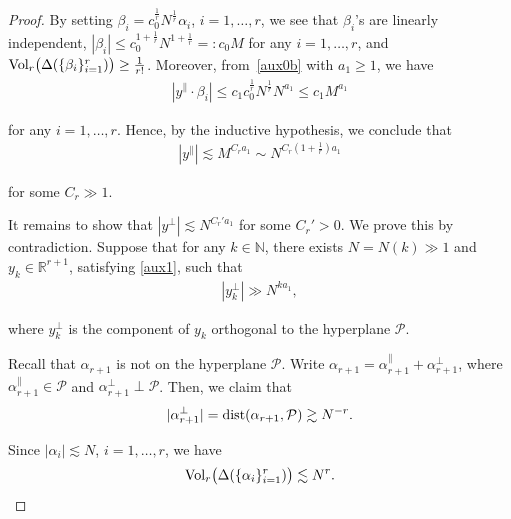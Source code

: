 \documentclass[%
11pt,  reqno]{amsart}
\newcommand{\1}{\hspace{0.2mm}\text{I}\hspace{0.2mm}}
\newcommand{\noi}{\noindent}
\newcommand{\R}{\mathbb{R}}
\newcommand{\al}{\alpha}
\newcommand{\be}{\beta}
\newcommand{\Dl}{\Delta}
\newcommand{\les}{\lesssim}
\newcommand{\ges}{\gtrsim}
\newcommand{\N}{\mathbb{N}}
\numberwithin{equation}{section}
\numberwithin{theorem}{section}
\begin{document}
\begin{proof}
\noi
By setting $\be_i = c_0^\frac 1r N^{\frac 1r} \al_i$, $i = 1, \dots, r$,
we see that $\be_i$'s are linearly independent,  
$|\be_i| \le c_0^{1 + \frac 1r} N^{1 + \frac 1r} =: c_0M$
for any 
$i = 1, \dots, r$,   and 
$\textup{Vol}_r
\big(\Dl(\{\be_i\}_{i = 1}^r)\big) \ge \frac1{r!}$.
Moreover, from~\eqref{aux0b} with $a_1 \ge 1$, we have 
\begin{align*}
|y^\parallel \cdot \be_i| \le c_1 c_0^\frac 1 r  N^\frac 1r N^{a_1}
\le c_1 M^{a_1}
\end{align*}

\noi
for any $i = 1, \dots, r$.
Hence, by the inductive hypothesis, we conclude that 
\begin{align}
|y^\parallel| \les M^{C_r a_1} \sim N^{C_r(1+ \frac 1r) a_1}
\label{YY2}
\end{align} 

\noi
for some $C_r \gg 1$.



It remains  to show that $|y^\perp| \les N^{C_r' a_1}$ for some $C_r' > 0$.
We prove this by contradiction.
Suppose that for any $k \in \N$, 
there exists $N = N(k) \gg1$ and $y_k\in \R^{r+1}$, satisfying
\eqref{aux1},  such that
\begin{align}
|y_k^\perp| \gg N^{ka_1},
\label{YY3} 
\end{align}

\noi
 where $y_k^\perp$ is the component of $y_k$ orthogonal to the hyperplane $\mathcal P$.





Recall that  $\al_{r+1}$ is not on the hyperplane $\mathcal P$.
Write $\al_{r+1} = \al_{r+1}^\parallel + \al_{r+1}^\perp$, 
where 
$\al_{r+1}^\parallel \in \mathcal P$ and $\al_{r+1}^\perp\perp \mathcal P$.
Then, 
 we claim that
\begin{align}\label{dist}
|\al_{r+1}^\perp| = {\rm dist} (\al_{r+1}, \mathcal P) \ges N^{-r}.
\end{align}

\noi
Since $ |\al_i| \les  N$, $i = 1, \dots, r$, 
we have 
\begin{align}
\textup{Vol}_r\big(\Dl(\{\al_i\}_{i = 1}^r)\big) \les N^r.
\label{YY4}
\end{align}



\end{proof}
\end{document}
